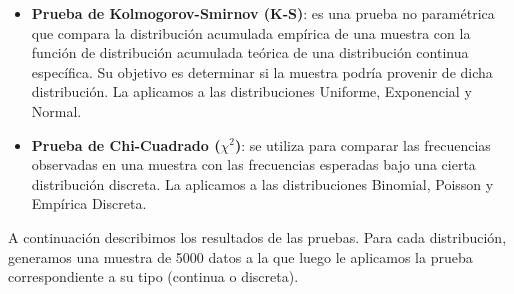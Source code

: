 \documentclass{article}
\begin{document}
\begin{itemize}
    \item \textbf{Prueba de Kolmogorov-Smirnov (K-S)}: es una prueba no paramétrica que compara la distribución acumulada empírica de una muestra con la función de distribución acumulada teórica de una distribución continua específica. Su objetivo es determinar si la muestra podría provenir de dicha distribución. La aplicamos a las distribuciones Uniforme, Exponencial y Normal.
    \item \textbf{Prueba de Chi-Cuadrado ($\chi^2$)}: se utiliza para comparar las frecuencias observadas en una muestra con las frecuencias esperadas bajo una cierta distribución discreta. La aplicamos a las distribuciones Binomial, Poisson y Empírica Discreta.
\end{itemize}

A continuación describimos los resultados de las pruebas. Para cada distribución, generamos una muestra de 5000 datos a la que luego le aplicamos la prueba correspondiente a su tipo (continua o discreta).
\end{document}
